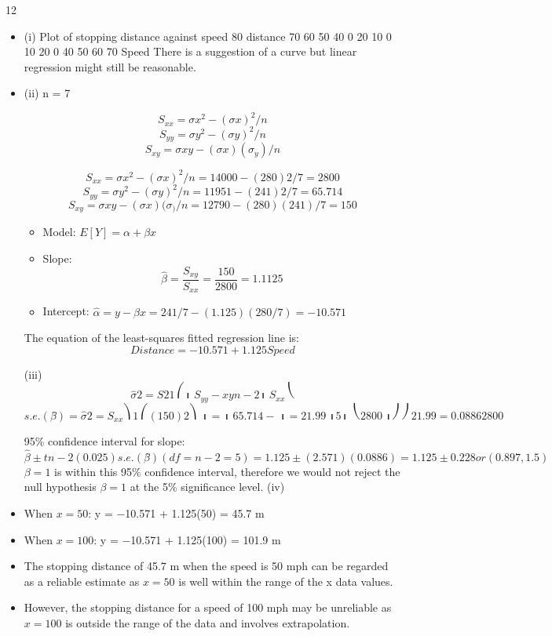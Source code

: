 \documentclass[a4paper,12pt]{article}
\begin{document}
12
\begin{itemize}
\item (i)
Plot of stopping distance against speed
80
distance
70
60
50
40
0
20
10
0
10
20
0
40
50
60
70
Speed
There is a suggestion of a curve but linear regression might still be reasonable.
\item (ii)
n = 7

\[S_{xx} = \sigma x^2 − (\sigma x)^2 /n \]
\[S_{yy} = \sigma y^2 − (\sigma y)^2 /n \]
\[S_{xy} = \sigma xy − (\sigma x)( \sigma_y)/n \]


\[S_{xx} = \sigma x^2 − (\sigma x)^2 /n = 14000 − (280) 2 /7 = 2800\]
\[S_{yy} = \sigma y^2 − (\sigma y)^2 /n = 11951 − (241) 2 /7 = 65.714\]
\[S_{xy} = \sigma xy − (\sigma x)( \sigma_ )/n = 12790 − (280)(241)/7 = 150\]
\begin{itemize}
    \item 

Model: $E[Y] = \alpha + \beta x$
\item Slope: \[\hat{\beta} =
\frac{S_{xy}}{S_{xx}} = \frac{150}{2800} = 1.1125\]

\item Intercept: $\hat{\alpha} = y − \hat{\beta} x = 241/7 − (1.125)(280/7) = −10.571$
\end{itemize}
The equation of the least-squares fitted regression line is:
\[Distance = −10.571 + 1.125 Speed\]


(iii)
\[\hat{\sigma} 2 =
S 2
1 ⎛
⎜ S_{yy} − xy
n − 2 ⎜
S_{xx}
⎝\]
\[s.e.( \betâ ) =
\hat{\sigma} 2
=
S_{xx}
⎞ 1 ⎛
(150) 2 ⎞
⎟ = ⎜ 65.714 −
⎟ = 21.99
⎟ 5 ⎜ ⎝
2800 ⎟ ⎠
⎠
21.99
= 0.0886
2800\]

95\% confidence interval for slope:
\[\hat{\beta} \pm t n − 2 (0.025) s.e.( \betâ )
(df = n − 2 = 5)
= 1.125 \pm (2.571)(0.0886) = 1.125 \pm 0.228 or (0.897, 1.5)\]
$\beta = 1$ is within this 95\% confidence interval, therefore we would not reject the
null hypothesis $\beta = 1$ at the 5\% significance level.
(iv)
\item When $x = 50$: y = −10.571 + 1.125(50) = 45.7 m
\item When $x = 100$: y = −10.571 + 1.125(100) = 101.9 m
\item The stopping distance of 45.7 m when the speed is 50 mph can be regarded as a reliable estimate as $x = 50$ is well within the range of the x data values.
\item However, the stopping distance for a speed of 100 mph may be unreliable as $x = 100$ is outside the range of the data and involves extrapolation.
\end{itemize}
\end{document}
